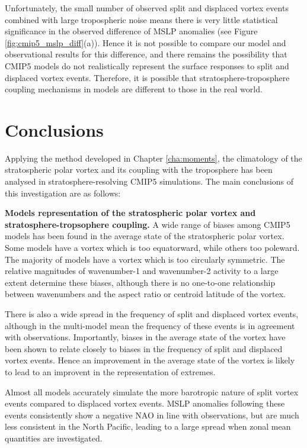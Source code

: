 Unfortunately, the small number of observed split and displaced vortex events
combined with large tropospheric noise means there is very little statistical
significance in the observed difference of MSLP anomalies (see Figure
\ref{fig:cmip5_mslp_diff}(a)). Hence it is not possible to compare our model and
observational results for this difference, and there remains the
possibility that CMIP5 models do not realistically represent the surface
responses to split and displaced vortex events. Therefore, it is possible that
stratosphere-troposphere coupling mechanisms in models are different to those in
the real world. 

\section{Conclusions}

Applying the method developed in Chapter \ref{cha:moments}, the climatology of
the stratospheric polar vortex and its coupling with the troposphere has been
analysed in stratosphere-resolving CMIP5 simulations. The main conclusions of
this investigation are as follows:


\bigskip\noindent\textbf{Models representation of the stratospheric polar vortex and
  stratosphere-tropsophere coupling.} A wide range of biases among CMIP5 models
has been found in the average state of the stratospheric polar vortex. Some
models have a vortex which is too equatorward, while others too poleward. The
majority of models have a vortex which is too circularly symmetric. The relative
magnitudes of wavenumber-1 and wavenumber-2 activity to a large extent determine
these biases, although there is no one-to-one relationship between wavenumbers
and the aspect ratio or centroid latitude of the vortex. 

There is also a wide spread in the frequency of split and displaced vortex
events, although in the multi-model mean the frequency of these events is in
agreement with observations. Importantly, biases in the average state of the
vortex have been shown to relate closely to biases in the frequency of split and
displaced vortex events. Hence an improvement in the average state of the vortex
is likely to lead to an improvent in the representation of extremes.

Almost all models accurately simulate the more barotropic nature of split vortex
events compared to displaced vortex events. MSLP anomalies following these
events consistently show a negative NAO in line with observations, but are much
less consistent in the North Pacific, leading to a large spread when zonal mean
quantities are investigated. 


